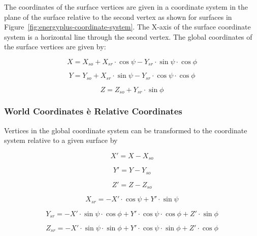 The coordinates of the surface vertices are given in a coordinate system in the plane of the surface relative to the second vertex as shown for surfaces in Figure~\ref{fig:energyplus-coordinate-system}. The X-axis of the surface coordinate system is a horizontal line through the second vertex. The global coordinates of the surface vertices are given by:

\begin{equation}
X = {X_{so}} + {X_{sr}}\cdot \cos \psi  - {Y_{sr}}\cdot \sin \psi \cdot \cos \phi
\end{equation}

\begin{equation}
Y = {Y_{so}} + {X_{sr}}\cdot \sin \psi  - {Y_{sr}}\cdot \cos \psi \cdot \cos \phi
\end{equation}

\begin{equation}
Z = {Z_{so}} + {Y_{sr}}\cdot \sin \phi
\end{equation}

\subsubsection{World Coordinates è Relative Coordinates}\label{world-coordinates-uxe8-relative-coordinates}

Vertices in the global coordinate system can be transformed to the coordinate system relative to a given surface by

\begin{equation}
{X'} = X - {X_{so}}
\end{equation}

\begin{equation}
{Y'} = Y - {Y_{so}}
\end{equation}

\begin{equation}
{Z'} = Z - {Z_{so}}
\end{equation}

\begin{equation}
{X_{sr}} =  - {X'}\cdot \cos \psi  + {Y'}\cdot \sin \psi
\end{equation}

\begin{equation}
{Y_{sr}} =  - {X'}\cdot \sin \psi \cdot \cos \phi  + {Y'}\cdot \cos \psi \cdot \cos \phi  + {Z'}\cdot \sin \phi
\end{equation}

\begin{equation}
{Z_{sr}} =  - {X'}\cdot \sin \psi \cdot \sin \phi  + {Y'}\cdot \cos \psi \cdot \sin \phi  + {Z'}\cdot \cos \phi
\end{equation}

